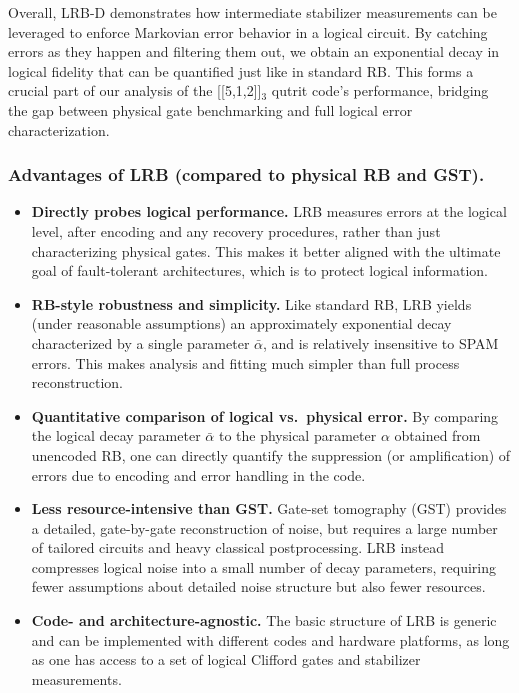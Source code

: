 Overall, LRB-D demonstrates how intermediate stabilizer measurements can
be leveraged to enforce Markovian error behavior in a logical circuit.
By catching errors as they happen and filtering them out, we obtain an
exponential decay in logical fidelity that can be quantified just like
in standard RB. This forms a crucial part of our analysis of the
[[5,1,2]]$_3$ qutrit code’s performance, bridging the gap between
physical gate benchmarking and full logical error characterization.
\cite{Combes2017LRB,Harper2019FTIBM,Lacroix2025ColorCode}

\subsubsection{Advantages of LRB (compared to physical RB and GST).}
\begin{itemize}
  \item \textbf{Directly probes logical performance.}
  LRB measures errors at the logical level, after encoding and any
  recovery procedures, rather than just characterizing physical gates.
  This makes it better aligned with the ultimate goal of fault-tolerant
  architectures, which is to protect logical information.

  \item \textbf{RB-style robustness and simplicity.}
  Like standard RB, LRB yields (under reasonable assumptions) an
  approximately exponential decay characterized by a single parameter
  $\bar{\alpha}$, and is relatively insensitive to SPAM errors. This
  makes analysis and fitting much simpler than full process
  reconstruction.

  \item \textbf{Quantitative comparison of logical vs.\ physical error.}
  By comparing the logical decay parameter $\bar{\alpha}$ to the
  physical parameter $\alpha$ obtained from unencoded RB, one can
  directly quantify the suppression (or amplification) of errors due to
  encoding and error handling in the code.

  \item \textbf{Less resource-intensive than GST.}
  Gate-set tomography (GST) provides a detailed, gate-by-gate
  reconstruction of noise, but requires a large number of tailored
  circuits and heavy classical postprocessing. LRB instead compresses
  logical noise into a small number of decay parameters, requiring fewer
  assumptions about detailed noise structure but also fewer resources.

  \item \textbf{Code- and architecture-agnostic.}
  The basic structure of LRB is generic and can be implemented with
  different codes and hardware platforms, as long as one has access to a
  set of logical Clifford gates and stabilizer measurements.
\end{itemize}

